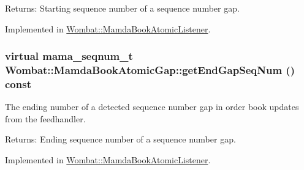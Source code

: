 \begin{Desc}
\item[Returns:]Starting sequence number of a sequence number gap. \end{Desc}


Implemented in \hyperlink{classWombat_1_1MamdaBookAtomicListener_9d33a337ef8f16888f6189f704ad1412}{Wombat::Mamda\-Book\-Atomic\-Listener}.\hypertarget{classWombat_1_1MamdaBookAtomicGap_54152f40fa9bc51cb2b67d3b64a911c3}{
\subsubsection[getEndGapSeqNum]{\setlength{\rightskip}{0pt plus 5cm}virtual mama\_\-seqnum\_\-t Wombat::Mamda\-Book\-Atomic\-Gap::get\-End\-Gap\-Seq\-Num () const}}
\label{classWombat_1_1MamdaBookAtomicGap_54152f40fa9bc51cb2b67d3b64a911c3}


The ending number of a detected sequence number gap in order book updates from the feedhandler. 

\begin{Desc}
\item[Returns:]Ending sequence number of a sequence number gap. \end{Desc}


Implemented in \hyperlink{classWombat_1_1MamdaBookAtomicListener_b965aab29205f4f229ad021094d6b16e}{Wombat::Mamda\-Book\-Atomic\-Listener}.